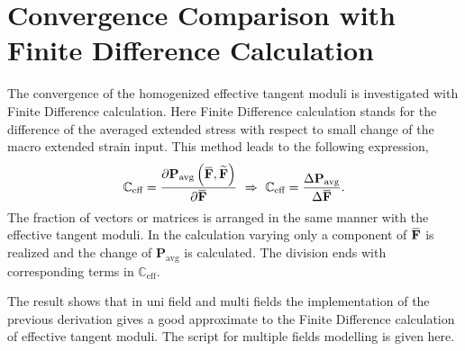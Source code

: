 \documentclass[10pt,a4paper]{scrreprt}
\newcommand{\overbar}[1]{\mkern 1.5mu\overline{\mkern-1.5mu#1\mkern-1.5mu}\mkern 1.5mu}
\begin{document}
\section{Convergence Comparison with Finite Difference Calculation}
The convergence of the homogenized effective tangent moduli is investigated with Finite Difference calculation. Here Finite Difference calculation stands for the difference of the averaged extended stress with respect to small change of the macro extended strain input. This method leads to the following expression, 
\begin{equation}
\mathbb{C}_{\text{eff}} = \dfrac{\partial \mathbf{P}_{\text{avg}} \left( \overbar{\mathbf{F}}, \widetilde{\mathbf{F}} \right)}{\partial \overbar{\mathbf{F}}} \ \Rightarrow \ \mathbb{C}_{\text{eff}} = \dfrac{\Delta \mathbf{P}_{\text{avg}}}{\Delta \overbar{\mathbf{F}}}.
\end{equation}
The fraction of vectors or matrices is arranged in the same manner with the effective tangent moduli. In the calculation varying only a component of $\overbar{\mathbf{F}}$ is realized and the change of $\mathbf{P}_{\text{avg}}$ is calculated. The division ends with corresponding terms in $\mathbb{C}_{\text{eff}}$.

The result shows that in uni field and multi fields the implementation of the previous derivation gives a good approximate to the Finite Difference calculation of effective tangent moduli. The script for multiple fields modelling is given here.
\end{document}
